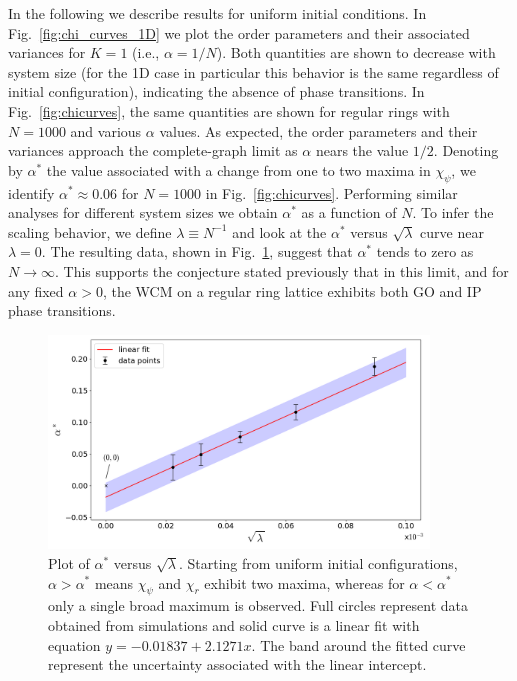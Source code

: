 In the following we describe results for uniform initial conditions. In Fig.~\ref{fig:chi_curves_1D} we plot the order parameters and
their associated variances for $K=1$ (i.e.,  $\alpha=1/N$). Both quantities are shown to decrease with system size (for the 1D case in
particular this behavior is the same regardless of initial configuration), indicating the absence of phase transitions. In
Fig.~\ref{fig:chicurves}, the same quantities are shown for regular rings with $N=1000$ and various $\alpha$ values.  As expected, the
order parameters and their variances approach the complete-graph limit as $\alpha$ nears the value $1/2$.  Denoting by $\alpha^*$ the
value associated with a change from one to two maxima in $\chi_{\psi}$, we identify $\alpha^* \approx 0.06$ for $N=1000$ in
Fig.~\ref{fig:chicurves}.  Performing similar analyses for different system sizes we obtain $\alpha^*$ as a function of $N$.  To infer
the scaling behavior, we define $\lambda \equiv N^{-1}$ and look at the $\alpha^*$ versus $\sqrt{\lambda}$ curve near $\lambda=0$. The
resulting data, shown in Fig.~\ref{fig:alphasplit}, suggest that $\alpha^*$ tends to zero as $N\to\infty$. This supports the conjecture
stated previously that in this limit, and for any fixed $\alpha>0$, the WCM on a regular ring lattice exhibits both GO and IP phase
transitions.

\begin{figure}
\begin{center}
    \includegraphics[width=0.9\textwidth]{fig/alphasplit.png}
    \caption{\label{fig:alphasplit} Plot of $\alpha^*$ versus $\sqrt{\lambda}$. Starting from uniform initial configurations, $\alpha >
        \alpha^*$ means $\chi_{\psi}$ and $\chi_r$ exhibit two maxima, whereas for $\alpha < \alpha^*$ only a single broad maximum is
        observed. Full circles represent data obtained from simulations and solid curve is a linear fit with equation
        $y=-0.01837+2.1271x$. The band around the fitted curve represent the uncertainty associated with the linear intercept.}
\end{center}
\end{figure}

